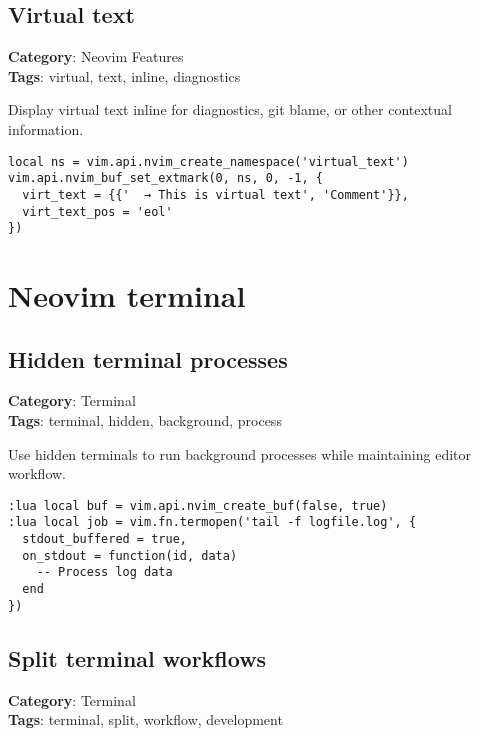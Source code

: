{{{{{{{{{\section{Virtual text}

\textbf{Category}: Neovim Features\\ \textbf{Tags}: virtual, text, inline, diagnostics
\vspace{0.5cm}

Display virtual text inline for diagnostics, git blame, or other contextual information.

\begin{Exa*}{}
\begin{Verbatim}[fontsize=\footnotesize, breaklines, breakanywhere]
local ns = vim.api.nvim_create_namespace('virtual_text')
vim.api.nvim_buf_set_extmark(0, ns, 0, -1, {
  virt_text = {{'  → This is virtual text', 'Comment'}},
  virt_text_pos = 'eol'
})
\end{Verbatim}
\end{Exa*}

\chapter{Neovim terminal}
\section{Hidden terminal processes}

\textbf{Category}: Terminal\\ \textbf{Tags}: terminal, hidden, background, process
\vspace{0.5cm}

Use hidden terminals to run background processes while maintaining editor workflow.

\begin{Exa*}{}
\begin{Verbatim}[fontsize=\footnotesize, breaklines, breakanywhere]
:lua local buf = vim.api.nvim_create_buf(false, true)
:lua local job = vim.fn.termopen('tail -f logfile.log', {
  stdout_buffered = true,
  on_stdout = function(id, data) 
    -- Process log data
  end
})
\end{Verbatim}
\end{Exa*}

\section{Split terminal workflows}

\textbf{Category}: Terminal\\ \textbf{Tags}: terminal, split, workflow, development
\vspace{0.5cm}

}}}}}}}}}
